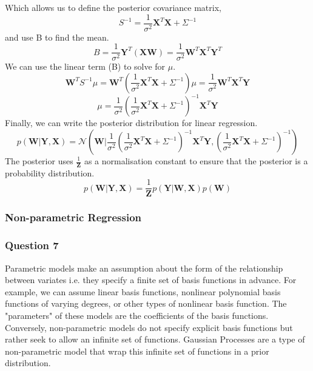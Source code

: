 \documentclass[10pt, a4paper, twocolumn]{article} %
\begin{document}
Which allows us to define the posterior covariance matrix,
\begin{equation*}
S^{-1} = \frac{1}{\sigma^{2}}\mathbf{X}^{T}\mathbf{X}+\Sigma^{-1}
\end{equation*}
and use B to find the mean. 
\begin{equation*}
B=\frac{1}{\sigma^{2}}\mathbf{Y}^T(\mathbf{XW}) = \frac{1}{\sigma^2}\mathbf{W}^T\mathbf{X}^T\mathbf{Y}^T
\end{equation*}
We can use the linear term (B) to solve for $\mu$.
\begin{equation*}
\mathbf{W}^TS^{-1}\mu = \mathbf{W}^{T}(\frac{1}{\sigma^2}\mathbf{X}^T\mathbf{X}+\Sigma^{-1})\mu=\frac{1}{\sigma^2}\mathbf{W}^T\mathbf{X}^T\mathbf{Y}
\end{equation*}
\begin{equation*}
\mu = \frac{1}{\sigma^2}(\frac{1}{\sigma^2}\mathbf{X}^T\mathbf{X}+\Sigma^{-1})^{-1}\mathbf{X}^{T}\mathbf{Y}
\end{equation*}
Finally, we can write the posterior distribution for linear regression.
\begin{equation}
p(\mathbf{W|Y,X}) = \mathcal{N}(\textbf{W}|\frac{1}{\sigma^2}(\frac{1}{\sigma^2}\mathbf{X}^T\mathbf{X}+\Sigma^{-1})^{-1}\mathbf{X}^T\mathbf{Y},(\frac{1}{\sigma^2}\mathbf{X}^T\mathbf{X}+\Sigma^{-1})^{-1})
\end{equation}
The posterior uses $\frac{1}{\mathbf{Z}}$ as a normalisation constant to ensure that the posterior is a probability distribution.
\begin{equation*}
p(\mathbf{W|Y, X}) = \frac{1}{\mathbf{Z}}p(\mathbf{Y|W,X})p(\mathbf{W})
\end{equation*}


\subsubsection{Non-parametric Regression}

\subsubsection*{Question 7}

Parametric models make an assumption about the form of the relationship between variates i.e. they specify a finite set of basis functions in advance. For example, we can assume linear basis functions, nonlinear polynomial basis functions of varying degrees, or other types of nonlinear basis function. The "parameters" of these models are the coefficients of the basis functions. Conversely, non-parametric models do not specify explicit basis functions but rather seek to allow an infinite set of functions. Gaussian Processes are a type of non-parametric model that wrap this infinite set of functions in a prior distribution.
\end{document}
